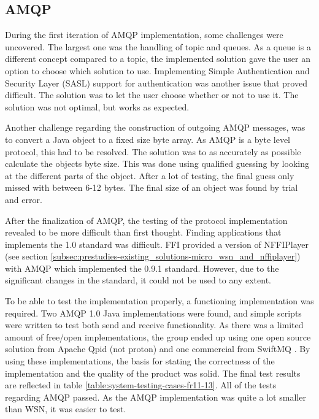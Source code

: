\subsection{AMQP}
\label{subsec:Implementation_AMQP}

During the first iteration of AMQP implementation, some challenges were uncovered. The largest one was the handling of topic and queues. As a queue is a different concept compared to a topic, the implemented solution gave the user an option to choose which solution to use. Implementing Simple Authentication and Security Layer (SASL) support for authentication was another issue that proved difficult. The solution was to let the user choose whether or not to use it. The solution was not optimal, but works as expected.

Another challenge regarding the construction of outgoing AMQP messages, was to convert a Java object to a fixed size byte array. As AMQP is a byte level protocol, this had to be resolved. The solution was to as accurately as possible calculate the objects byte size. This was done using qualified guessing by looking at the different parts of the object. After a lot of testing, the final guess only missed with between 6-12 bytes. The final size of an object was found by trial and error. 

After the finalization of AMQP, the testing of the protocol implementation revealed to be more difficult than first thought. Finding applications that implements the 1.0 standard was difficult. FFI provided a version of NFFIPlayer (see section \ref{subsec:prestudies-existing_solutions-micro_wsn_and_nffiplayer}) with AMQP which implemented the 0.9.1 standard. However, due to the significant changes in the standard, it could not be used to any extent.

To be able to test the implementation properly, a functioning implementation was required. Two AMQP 1.0 Java implementations were found, and simple scripts were written to test both send and receive functionality. As there was a limited amount of free/open implementations, the group ended up using one open source solution from Apache Qpid (not proton) \cite{apache-qpid} and one commercial from SwiftMQ \cite{swift-mq}. By using these implementations, the basis for stating the correctness of the implementation and the quality of the product was solid. The final test results are reflected in table \ref{table:system-testing-cases-fr11-13}. All of the tests regarding AMQP passed. As the AMQP implementation was quite a lot smaller than WSN, it was easier to test.
